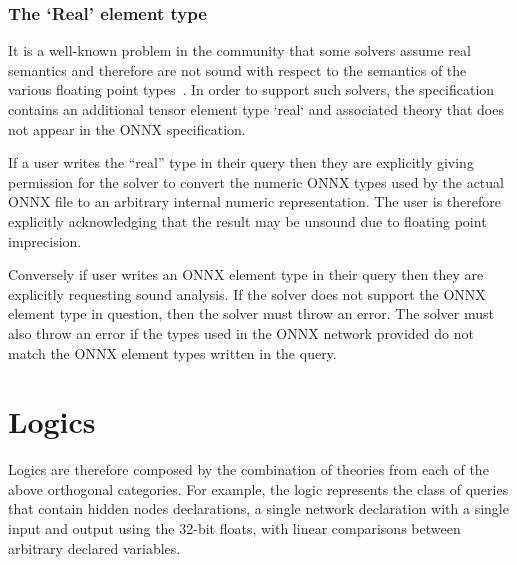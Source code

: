 \subsubsection{The `Real' element type}

It is a well-known problem in the community that some solvers assume real semantics and therefore are not sound with respect to the semantics of the various floating point types~\cite{jia2021exploiting}. In order to support such solvers, the specification contains an additional tensor element type `real` and associated theory that does not appear in the ONNX specification.

If a user writes the ``real'' type in their \vnnlib{} query then they are explicitly giving permission for the solver to convert the numeric ONNX types used by the actual ONNX file to an arbitrary internal numeric representation. The user is therefore explicitly acknowledging that the result may be unsound due to floating point imprecision. 

Conversely if user writes an ONNX element type in their \vnnlib{} query then they are explicitly requesting sound analysis. If the solver does not support the ONNX element type in question, then the solver must throw an error. The solver must also throw an error if the types used in the ONNX network provided do not match the ONNX element types written in the query.

\section{Logics}

Logics are therefore composed by the combination of theories from each of the above orthogonal categories. For example, the logic  represents the class of queries that contain hidden nodes declarations, a single network declaration with a single input and output using the 32-bit floats, with linear comparisons between arbitrary declared variables.
